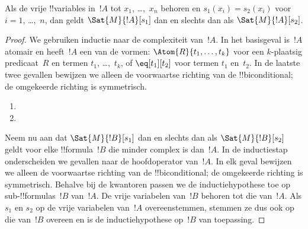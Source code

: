 \documentclass[../../../include/open-logic-section]{subfiles}
\begin{document}
\begin{prop}
Als de vrije !!{variable}s in~$!A$ tot $x_1$, \dots,~$x_n$ behoren
en $s_1(x_i) = s_2(x_i)$ voor $i = 1$, \dots,~$n$, dan geldt
$\Sat{M}{!A}[s_1]$ dan en slechts dan als $\Sat{M}{!A}[s_2]$.
\end{prop}

\begin{proof}
We gebruiken inductie naar de complexiteit van~$!A$. In het
basisgeval is~$!A$ atomair en heeft~$!A$ een van de vormen:
$\Atom{R}{t_1, \dots, t_k}$ voor een $k$-plaatsig predicaat~$R$ en
termen $t_1$, \dots,~$t_k$, of $\eq[t_1][t_2]$ voor termen $t_1$
en~$t_2$. In de laatste twee gevallen bewijzen we alleen de voorwaartse
richting van de !!{biconditional}; de omgekeerde richting is
symmetrisch.

\begin{enumerate}


\item
\item
\end{enumerate}

Neem nu aan dat $\Sat{M}{!B}[s_1]$ dan en slechts dan als
$\Sat{M}{!B}[s_2]$ geldt voor elke !!{formula}~$!B$ die minder complex
is dan~$!A$. In de inductiestap onderscheiden we gevallen naar de
hoofdoperator van~$!A$. In elk geval bewijzen we alleen de
voorwaartse richting van de !!{biconditional}; de omgekeerde richting
is symmetrisch. Behalve bij de kwantoren passen we de
inductiehypothese toe op sub-!!{formula}s~$!B$ van~$!A$. De vrije
variabelen van~$!B$ behoren tot die van~$!A$. Als $s_1$ en $s_2$ op de
vrije variabelen van~$!A$ overeenstemmen, stemmen ze dus ook op die
van~$!B$ overeen en is de inductiehypothese op~$!B$ van toepassing.


\end{proof}
\end{document}
